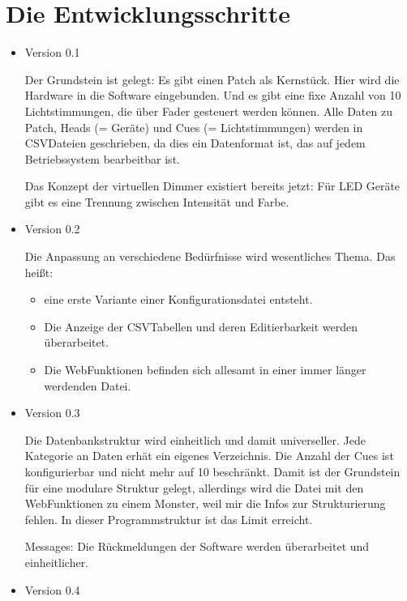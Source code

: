 \documentclass[letterpaper,10pt,ngerman]{sphinxmanual}
\begin{document}
\section{Die Entwicklungsschritte}
\label{\detokenize{history:die-entwicklungsschritte}}\begin{itemize}
\item {} 
Version 0.1

Der Grundstein ist gelegt: Es gibt einen Patch als Kernstück. Hier
wird die Hardware in die Software eingebunden.
Und es gibt eine fixe Anzahl von 10 Lichtstimmungen, die über
Fader gesteuert werden können. Alle Daten zu Patch, Heads (= Geräte) und
Cues (= Lichtstimmungen) werden in CSV\sphinxhyphen{}Dateien geschrieben, da dies ein
Datenformat ist, das auf jedem Betriebssystem bearbeitbar ist.

Das Konzept der virtuellen Dimmer existiert bereits jetzt: Für LED Geräte
gibt es eine Trennung zwischen Intensität und Farbe.

\item {} 
Version 0.2

Die Anpassung an verschiedene Bedürfnisse wird wesentliches Thema.
Das heißt:
\begin{itemize}
\item {} 
eine erste Variante einer Konfigurationsdatei entsteht.

\item {} 
Die Anzeige der CSV\sphinxhyphen{}Tabellen und deren Editierbarkeit werden
überarbeitet.

\item {} 
Die Web\sphinxhyphen{}Funktionen befinden sich allesamt in einer immer länger
werdenden Datei.

\end{itemize}

\item {} 
Version 0.3

Die Datenbankstruktur wird einheitlich und damit universeller. Jede
Kategorie an Daten erhät ein eigenes Verzeichnis. Die Anzahl der Cues ist
konfigurierbar und nicht mehr auf 10 beschränkt. Damit ist der Grundstein
für eine modulare Struktur gelegt, allerdings wird die Datei mit den
Web\sphinxhyphen{}Funktionen zu einem Monster, weil mir die Infos zur
Strukturierung fehlen. In dieser Programmstruktur ist das Limit erreicht.

Messages: Die Rückmeldungen der Software werden überarbeitet und
einheitlicher.

\item {} 
Version 0.4


\end{itemize}
\end{document}
